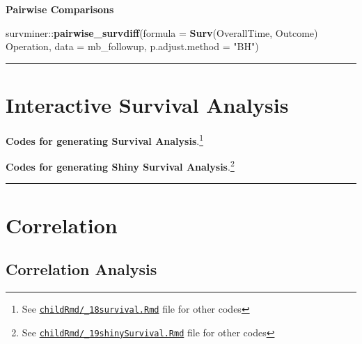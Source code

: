 \documentclass[
]{article}
\newenvironment{Shaded}{\begin{snugshade}}{\end{snugshade}}
\newcommand{\DataTypeTok}[1]{\textcolor[rgb]{0.00,0.34,0.68}{#1}}
\newcommand{\KeywordTok}[1]{\textcolor[rgb]{0.12,0.11,0.11}{\textbf{#1}}}
\newcommand{\NormalTok}[1]{\textcolor[rgb]{0.12,0.11,0.11}{#1}}
\newcommand{\OperatorTok}[1]{\textcolor[rgb]{0.12,0.11,0.11}{#1}}
\newcommand{\StringTok}[1]{\textcolor[rgb]{0.75,0.01,0.01}{#1}}
\begin{document}
\begin{landscape}
\pagebreak

\textbf{Pairwise Comparisons}

\begin{Shaded}
\begin{Highlighting}[]
\NormalTok{survminer}\OperatorTok{::}\KeywordTok{pairwise_survdiff}\NormalTok{(}\DataTypeTok{formula =} \KeywordTok{Surv}\NormalTok{(OverallTime, Outcome) }\OperatorTok{~}\StringTok{ }\NormalTok{Operation, }\DataTypeTok{data =}\NormalTok{ mb_followup, }
    \DataTypeTok{p.adjust.method =} \StringTok{"BH"}\NormalTok{)}
\end{Highlighting}
\end{Shaded}

\pagebreak

\begin{center}\rule{0.5\linewidth}{0.5pt}\end{center}

\hypertarget{interactive-survival-analysis}{%
\section{Interactive Survival
Analysis}\label{interactive-survival-analysis}}

\textbf{Codes for generating Survival Analysis}.\footnote{See
  \href{https://github.com/sbalci/histopathology-template/blob/master/childRmd/_18survival.Rmd}{\texttt{childRmd/\_18survival.Rmd}}
  file for other codes}

\textbf{Codes for generating Shiny Survival Analysis}.\footnote{See
  \href{https://github.com/sbalci/histopathology-template/blob/master/childRmd/_19shinySurvival.Rmd}{\texttt{childRmd/\_19shinySurvival.Rmd}}
  file for other codes}

\begin{center}\rule{0.5\linewidth}{0.5pt}\end{center}

\end{landscape}

\hypertarget{correlation}{%
\section{Correlation}\label{correlation}}

\hypertarget{correlation-analysis}{%
\subsection{Correlation Analysis}\label{correlation-analysis}}
\end{document}
